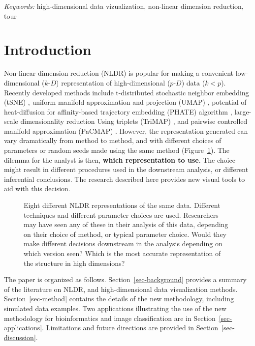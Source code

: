 \documentclass[
  12pt]{article}
\newcommand\pD{$p\text{-}D$}
\newcommand\kD{$k\text{-}D$}
\begin{document}
\noindent%
{\it Keywords:} high-dimensional data vizualization, non-linear
dimension reduction, tour
\vfill

\newpage
{} %



\section{Introduction}\label{introduction}

Non-linear dimension reduction (NLDR) is popular for making a convenient
low-dimensional (\kD{}) representation of high-dimensional (\pD{}) data
(\(k < p\)). Recently developed methods include t-distributed stochastic
neighbor embedding (tSNE) \citep{laurens2008}, uniform manifold
approximation and projection (UMAP) \citep{leland2018}, potential of
heat-diffusion for affinity-based trajectory embedding (PHATE) algorithm
\citep{moon2019}, large-scale dimensionality reduction Using triplets
(TriMAP) \citep{amid2022}, and pairwise controlled manifold
approximation (PaCMAP) \citep{yingfan2021}. However, the representation
generated can vary dramatically from method to method, and with
different choices of parameters or random seeds made using the same
method (Figure~\ref{fig-NLDR-variety}). The dilemma for the analyst is
then, \textbf{which representation to use}. The choice might result in
different procedures used in the downstream analysis, or different
inferential conclusions. The research described here provides new visual
tools to aid with this decision.

\begin{figure}


\caption{\label{fig-NLDR-variety}Eight different NLDR representations of
the same data. Different techniques and different parameter choices are
used. Researchers may have seen any of these in their analysis of this
data, depending on their choice of method, or typical parameter choice.
Would they make different decisions downstream in the analysis depending
on which version seen? Which is the most accurate representation of the
structure in high dimensions?}

\end{figure}%

The paper is organized as follows. Section~\ref{sec-background} provides
a summary of the literature on NLDR, and high-dimensional data
visualization methods. Section~\ref{sec-method} contains the details of
the new methodology, including simulated data examples. Two applications
illustrating the use of the new methodology for bioinformatics and image
classification are in Section~\ref{sec-applications}. Limitations and
future directions are provided in Section~\ref{sec-discussion}.
\end{document}
